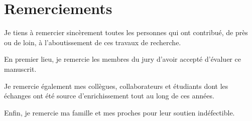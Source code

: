 
\chapter*{Remerciements}


Je tiens à remercier sincèrement toutes les personnes qui ont contribué, de près ou de loin,
à l'aboutissement de ces travaux de recherche.

En premier lieu, je remercie les membres du jury d'avoir accepté d'évaluer ce manuscrit.

Je remercie également mes collègues, collaborateurs et étudiants dont les échanges ont été
source d'enrichissement tout au long de ces années.

Enfin, je remercie ma famille et mes proches pour leur soutien indéfectible.
